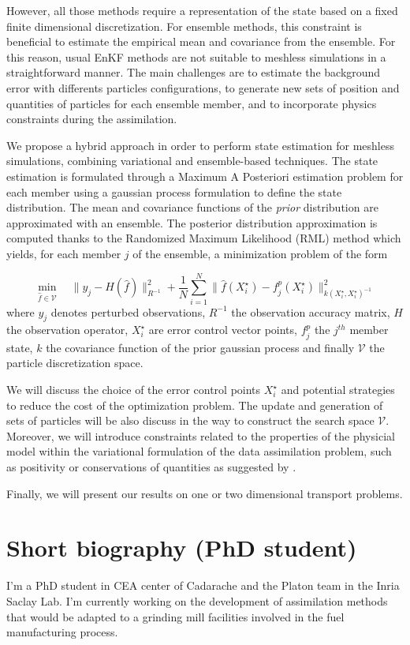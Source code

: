 \documentclass[a4paper,10pt,oneside]{article}
\newcommand{\xs}{X^\star}
\begin{document}
However, all those methods require a representation of the state based on a fixed finite dimensional discretization. For ensemble methods, this constraint is beneficial to estimate the empirical mean and covariance from the ensemble.
For this reason, usual EnKF methods are not suitable to meshless simulations in a straightforward manner.
The main challenges are to estimate the background error with differents particles configurations, to generate new sets of position and quantities of particles for each ensemble member, and to incorporate physics constraints during the assimilation.

We propose a hybrid approach in order to perform state estimation for meshless simulations, combining variational and ensemble-based techniques.
The state estimation is formulated through a Maximum A Posteriori estimation problem for each member using a gaussian process formulation to define the state distribution.
The mean and covariance functions of the \textit{prior} distribution are approximated with an ensemble. The posterior distribution approximation is computed thanks to the Randomized Maximum Likelihood (RML) method \cite{evensen_data_2022} which yields, for each member $j$ of the ensemble, a minimization problem of the form

\begin{equation*}
  \min_{\hat{f} \in \mathcal{V}} \quad \|y_j - H(\hat{f})\|_{R^{-1}}^2 + \frac{1}{N} \sum_{i=1}^N \|\hat{f}(\xs_i)- f^p_{j}(\xs_i)\|^2_{k(\xs_i,\xs_i)^{-1}}
\end{equation*}where $y_j$ denotes perturbed observations, $R^{-1}$ the observation accuracy matrix, $H$ the observation operator, $\xs_i$ are error control vector points, $f^p_{j}$ the $j^{th}$ member state, $k$ the covariance function of the prior gaussian process and finally $\mathcal{V}$ the particle discretization space.

We will discuss the choice of the error control points $\xs_i$ and potential strategies to reduce the cost of the optimization problem. The update and generation of sets of particles will be also discuss in the way to construct the search space $\mathcal{V}$. Moreover, we will introduce constraints related to the  properties of the physicial model within the variational formulation of the data assimilation problem, such as positivity or conservations of quantities as suggested by \cite{janjic_conservation_2014,albers_ensemble_2019}.

Finally, we will present our results on one or two dimensional transport problems.


\section*{Short biography (PhD student)}

I'm a PhD student in CEA center of Cadarache and the Platon team in the Inria Saclay Lab. I'm currently working on the development of assimilation methods that would be adapted to a grinding mill facilities involved in the fuel manufacturing process.



\end{document}
